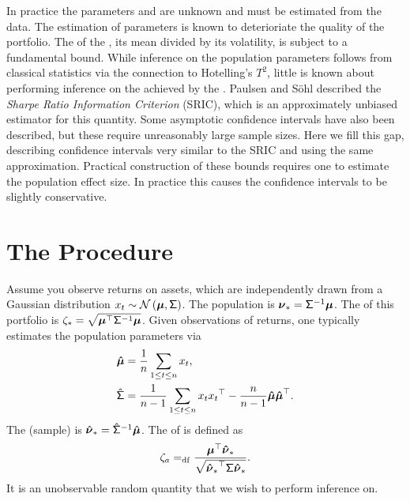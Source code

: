 \documentclass[10pt,a4paper,english]{article}
\theoremstyle{plain}
\theoremstyle{definition}
\theoremstyle{remark}
\begin{document}
In practice the parameters \pvmu and \pvsig are unknown and must be estimated from the data. 
The estimation of parameters is known to deterioriate the quality of the
portfolio.  \cite{michaud1989markowitz}
The \txtSNR of the \txtMP, its mean divided by its volatility, is subject to a 
fundamental bound. \cite{pav2014qbounds,ao2017solving}
While inference on the population parameters follows from classical statistics
via the connection to Hotelling's $T^2$, little is known about performing
inference on the \txtSNR achieved by the \txtMP.
Paulsen and S\"{o}hl described the \emph{Sharpe Ratio Information Criterion} (SRIC), 
which is an approximately unbiased estimator for this quantity.  \cite{doi:10.1080/14697688.2020.1718746}
Some asymptotic confidence intervals have also been described, but these
require unreasonably large sample sizes. \cite{pav2013markowitz}
Here we fill this gap, describing confidence intervals very similar
to the SRIC and using the same approximation.
Practical construction of these bounds requires one to estimate the population
effect size.
In practice this causes the confidence intervals to be slightly conservative.


\section{The Procedure}%

Assume you observe returns on \nstrat assets, 
which are independently drawn from a Gaussian distribution
$\reti[t]\sim\normlaw{\pvmu,\pvsig}$.
The population \txtMP is $\pportwopt=\minv{\pvsig}\pvmu$.
The \txtSNR of this portfolio is $\psnropt=\sqrt{\qiform{\pvsig}{\pvmu}}$.
Given \ssiz observations of returns, 
one typically estimates the population parameters via
\begin{align}
 \svmu &= \oneby{\ssiz} \sum_{1\le t \le \ssiz} \reti[t],\\
 \svsig &= \oneby{\ssiz-1} \sum_{1\le t \le \ssiz} \reti[t]\tr{\reti[t]} -
  \frac{\ssiz}{\ssiz-1}\svmu\tr{\svmu}.
\end{align}
The (sample) \txtMP is $\sportwopt=\minv{\svsig}\svmu$.
The \txtASNR of \sportwopt is defined as
\begin{equation}
  \psnr[a] \defeq \frac{\tr{\pvmu}\sportwopt}{\sqrt{\qform{\pvsig}{\sportwopt}}}.
\end{equation}
It is an unobservable random quantity that we wish to perform inference on.
\end{document}
